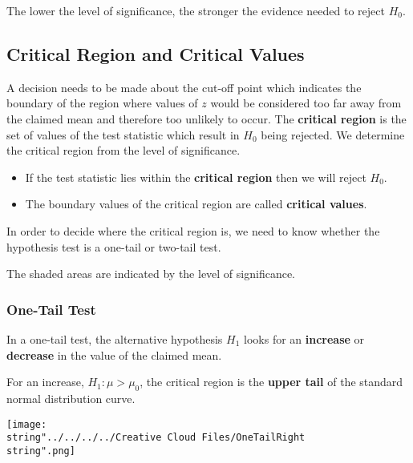 \documentclass[11pt,a4paper]{book}
\begin{document}
The lower the level of significance, the stronger the evidence needed
to reject $H_{0}$.

\newpage

\subsection{Critical Region and Critical Values}

A decision needs to be made about the cut-off point which indicates
the boundary of the region where values of $z$ would be considered
too far away from the claimed mean and therefore too unlikely to occur.
The \textbf{critical region} is the set of values of the test statistic
which result in $H_{0}$ being rejected. We determine the critical
region from the level of significance.

\begin{tcolorbox}[colback=blue!5, colframe=black, boxrule=.4pt, sharpish corners]

\begin{itemize}
\item If the test statistic lies within the \textbf{critical region} then
we will reject $H_{0}$.
\item The boundary values of the critical region are called \textbf{critical
values}.
\end{itemize}
\end{tcolorbox}

In order to decide where the critical region is, we need to know whether
the hypothesis test is a one-tail or two-tail test.

The shaded areas are indicated by the level of significance.

\subsubsection*{One-Tail Test}

In a one-tail test, the alternative hypothesis $H_{1}$ looks for
an \textbf{increase} or \textbf{decrease} in the value of the claimed
mean.

\begin{minipage}[t]{.5\textwidth}

For an increase, $H_{1}:\mu>\mu_{0}$, the critical region is the
\textbf{upper tail} of the standard normal distribution curve.

\end{minipage}
\begin{minipage}[t]{.5\textwidth}
\begin{center}
\texttt{[image: \\string"../../../../Creative Cloud Files/OneTailRight\\string".png]}
\par\end{center}

\end{minipage}
\end{document}
